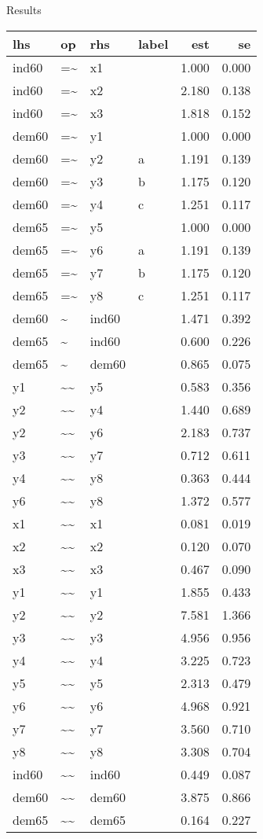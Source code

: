 \documentclass[10pt,ignorenonframetext,]{beamer}
\begin{document}
\begin{frame}{Results}

\tiny

\begin{longtable}[]{@{}llllrr@{}}
\toprule
lhs & op & rhs & label & est & se\tabularnewline
\midrule
\endhead
ind60 & =\textasciitilde{} & x1 & & 1.000 & 0.000\tabularnewline
ind60 & =\textasciitilde{} & x2 & & 2.180 & 0.138\tabularnewline
ind60 & =\textasciitilde{} & x3 & & 1.818 & 0.152\tabularnewline
dem60 & =\textasciitilde{} & y1 & & 1.000 & 0.000\tabularnewline
dem60 & =\textasciitilde{} & y2 & a & 1.191 & 0.139\tabularnewline
dem60 & =\textasciitilde{} & y3 & b & 1.175 & 0.120\tabularnewline
dem60 & =\textasciitilde{} & y4 & c & 1.251 & 0.117\tabularnewline
dem65 & =\textasciitilde{} & y5 & & 1.000 & 0.000\tabularnewline
dem65 & =\textasciitilde{} & y6 & a & 1.191 & 0.139\tabularnewline
dem65 & =\textasciitilde{} & y7 & b & 1.175 & 0.120\tabularnewline
dem65 & =\textasciitilde{} & y8 & c & 1.251 & 0.117\tabularnewline
dem60 & \textasciitilde{} & ind60 & & 1.471 & 0.392\tabularnewline
dem65 & \textasciitilde{} & ind60 & & 0.600 & 0.226\tabularnewline
dem65 & \textasciitilde{} & dem60 & & 0.865 & 0.075\tabularnewline
y1 & \textasciitilde{}\textasciitilde{} & y5 & & 0.583 &
0.356\tabularnewline
y2 & \textasciitilde{}\textasciitilde{} & y4 & & 1.440 &
0.689\tabularnewline
y2 & \textasciitilde{}\textasciitilde{} & y6 & & 2.183 &
0.737\tabularnewline
y3 & \textasciitilde{}\textasciitilde{} & y7 & & 0.712 &
0.611\tabularnewline
y4 & \textasciitilde{}\textasciitilde{} & y8 & & 0.363 &
0.444\tabularnewline
y6 & \textasciitilde{}\textasciitilde{} & y8 & & 1.372 &
0.577\tabularnewline
x1 & \textasciitilde{}\textasciitilde{} & x1 & & 0.081 &
0.019\tabularnewline
x2 & \textasciitilde{}\textasciitilde{} & x2 & & 0.120 &
0.070\tabularnewline
x3 & \textasciitilde{}\textasciitilde{} & x3 & & 0.467 &
0.090\tabularnewline
y1 & \textasciitilde{}\textasciitilde{} & y1 & & 1.855 &
0.433\tabularnewline
y2 & \textasciitilde{}\textasciitilde{} & y2 & & 7.581 &
1.366\tabularnewline
y3 & \textasciitilde{}\textasciitilde{} & y3 & & 4.956 &
0.956\tabularnewline
y4 & \textasciitilde{}\textasciitilde{} & y4 & & 3.225 &
0.723\tabularnewline
y5 & \textasciitilde{}\textasciitilde{} & y5 & & 2.313 &
0.479\tabularnewline
y6 & \textasciitilde{}\textasciitilde{} & y6 & & 4.968 &
0.921\tabularnewline
y7 & \textasciitilde{}\textasciitilde{} & y7 & & 3.560 &
0.710\tabularnewline
y8 & \textasciitilde{}\textasciitilde{} & y8 & & 3.308 &
0.704\tabularnewline
ind60 & \textasciitilde{}\textasciitilde{} & ind60 & & 0.449 &
0.087\tabularnewline
dem60 & \textasciitilde{}\textasciitilde{} & dem60 & & 3.875 &
0.866\tabularnewline
dem65 & \textasciitilde{}\textasciitilde{} & dem65 & & 0.164 &
0.227\tabularnewline
\bottomrule
\end{longtable}

\end{frame}
\end{document}
